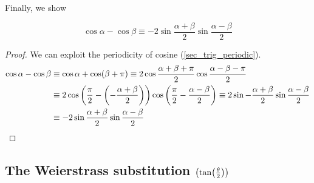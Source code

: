 Finally, we show
\begin{theorem}
\begin{equation*}
\cos \alpha - \cos \beta \equiv
 -2 \sin \frac{\alpha + \beta} 2 \sin \frac{\alpha - \beta} 2
\end{equation*}
\end{theorem}
\begin{proof}
We can exploit the periodicity of cosine (\ref{sec_trig_periodic}).
\begin{align*}
 \cos \alpha - \cos \beta &\equiv
 \cos \alpha + \cos (\beta + \pi)  \equiv
 2 \cos \frac{\alpha + \beta + \pi} 2 \cos \frac {\alpha - \beta - \pi} 2
 \\&\equiv
 2 \cos \pqty{\frac \pi 2 - \pqty{-\frac{\alpha + \beta} 2}}
   \cos \pqty{\frac \pi 2 - \frac{\alpha - \beta} 2} \equiv
 2 \sin -\frac{\alpha + \beta} 2 \sin \frac{\alpha - \beta} 2 \\&\equiv
 -2 \sin \frac{\alpha + \beta} 2 \sin \frac{\alpha - \beta} 2 \qedhere
\end{align*}
\end{proof}

\subsection[The Weierstrass substitution (\(\tan(\theta / 2)\))]
   {The Weierstrass substitution \boldmath\(\pqty{\tan(\frac \theta 2)}\)}

